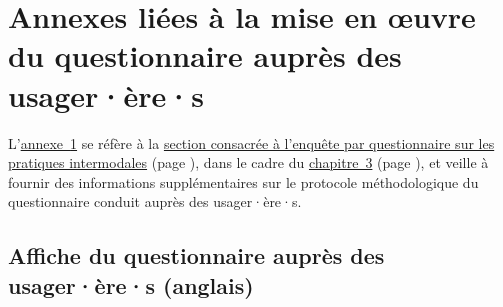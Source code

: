     \setcounter{section}{0}
\chapter{Annexes liées à la mise en œuvre du questionnaire auprès des usager·ère·s}
    \label{annexes:questionnaire-usagers}

L'\hyperref[annexes:questionnaire-usagers]{annexe~\ref{annexes:questionnaire-usagers}} se réfère à la \hyperref[chap3:questionnaire]{section consacrée à l'enquête par questionnaire sur les pratiques intermodales} (page \pageref{chap3:questionnaire}), dans le cadre du \hyperref[chap3:titre]{chapitre~3} (page \pageref{chap3:titre}), et veille à fournir des informations supplémentaires sur le protocole méthodologique du questionnaire conduit auprès des usager·ère·s.%

    \setcounter{tocdepth}{2}
    \renewcommand{\localcontentsname}{Structure de l'annexe~\ref{annexes:questionnaire-usagers}}
\localtableofcontents

    \newpage
\section{Affiche du questionnaire auprès des usager·ère·s (anglais)}
    \label{annexes:affiche-en-questionnaire-usagers}

